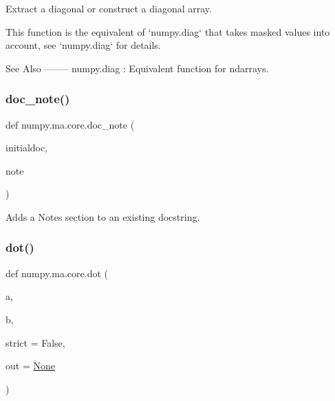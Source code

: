 \begin{DoxyVerb}Extract a diagonal or construct a diagonal array.

This function is the equivalent of `numpy.diag` that takes masked
values into account, see `numpy.diag` for details.

See Also
--------
numpy.diag : Equivalent function for ndarrays.\end{DoxyVerb}
 \mbox{\label{namespacenumpy_1_1ma_1_1core_a73128bf4780380b8bfe0473d5f9e7474}} 
\subsubsection{\texorpdfstring{doc\+\_\+note()}{doc\_note()}}
{\footnotesize\ttfamily def numpy.\+ma.\+core.\+doc\+\_\+note (\begin{DoxyParamCaption}\item[{}]{initialdoc,  }\item[{}]{note }\end{DoxyParamCaption})}

\begin{DoxyVerb}Adds a Notes section to an existing docstring.\end{DoxyVerb}
 \mbox{\label{namespacenumpy_1_1ma_1_1core_a044f5cdcff1aa842f909b038d3045ca0}} 
\subsubsection{\texorpdfstring{dot()}{dot()}}
{\footnotesize\ttfamily def numpy.\+ma.\+core.\+dot (\begin{DoxyParamCaption}\item[{}]{a,  }\item[{}]{b,  }\item[{}]{strict = {\ttfamily False},  }\item[{}]{out = {\ttfamily \hyperlink{namespacenumpy_1_1ma_1_1core_a647ee1848dfa3692fe35a663a2aa40b3}{None}} }\end{DoxyParamCaption})}

